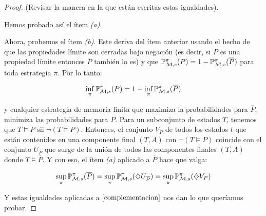 \begin{proof}
	(Revisar la manera en la que están escritas estas igualdades).

	Hemos probado así el ítem \textit{(a)}.

	Ahora, probemos el ítem \textit{(b)}. Este deriva del ítem anterior usando el
	hecho de que las propiedades límite son cerradas bajo negación (es decir, si
	$P$ es una propiedad límite entonces $\overline{P}$ también lo es) y que
	$\mathbb{P}_{\mathcal{M}, s}^\pi (P) = 1 - \mathbb{P}_{\mathcal{M}, s}^\pi(\overline{P})$ para toda estrategia $\pi$. Por
	lo tanto:

	\begin{equation}
		\label{complementacion}
		\inf_{\pi} \mathbb{P}_{\mathcal{M}, s}^\pi (P) = 1 - \inf_{\pi} \mathbb{P}_{\mathcal{M}, s}^\pi(\overline{P})
	\end{equation}

	y cualquier estrategia de memoria finita que maximiza la probabilidades para
	$\overline{P}$, minimiza las probabilidades para $P$. Para un subconjunto de
	estados $T$, tenemos que $T \models \overline{P}$ sii $\neg (T \models P)$.
	Entonces, el conjunto $V_P$ de todos los estados $t$ que están contenidos en
	una componente final $(T,A)$ con $\neg (T \models P)$ coincide con el conjunto
	$U_{\overline{P}}$ que surge de la unión de todos las componentes finales
	$(T,A)$ donde $T \models \overline{P}$. Y con eso, el ítem \textit{(a)}
	aplicado a $\overline{P}$ hace que valga:

	$$
		\sup_\pi \mathbb{P}_{\mathcal{M}, s}^\pi (\overline{P}) = \sup_\pi \mathbb{P}_{\mathcal{M}, s}^\pi (\diamondsuit U_{\overline{P}}) = \sup_\pi \mathbb{P}_{\mathcal{M}, s}^\pi (\diamondsuit V_P)
	$$

	Y estas igualdades aplicadas a $\ref{complementacion}$ nos dan lo que queríamos
	probar.

\end{proof}
